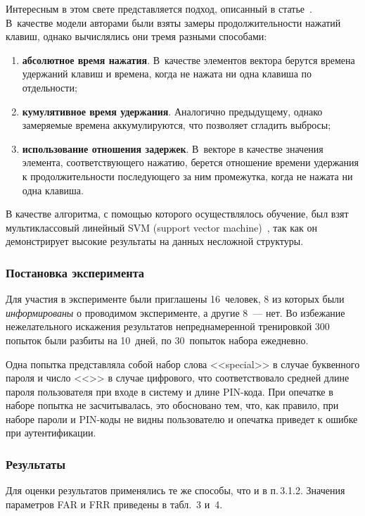\begin{multicols}{2}
Интересным в этом свете представляется подход, описанный в статье~\cite{saggio}. 
В~качестве модели авторами были взяты замеры
продолжительности нажатий клавиш, однако вычислялись они тремя
разными способами:
\begin{enumerate}[(1)]
    \item {\bf абсолютное время нажатия}. 
    В~качестве элементов вектора берутся времена удержаний клавиш и времена, 
    когда не нажата ни одна клавиша по отдельности;
    \item {\bf кумулятивное время удержания}. Аналогично предыдущему, однако 
    замеряемые времена аккумулируются, что позволяет сгладить вы\-бросы;
    \item {\bf использование отношения задержек}. В~векторе в качестве значения элемента, 
    соответствующего нажатию, берется отношение времени удержания к продолжительности 
    последующего за ним промежутка, когда не нажата ни одна клавиша.
\end{enumerate}
В качестве алгоритма, с помощью которого осуществлялось обучение,
был взят мультиклассовый линейный SVM (support vector machine)~\cite{svm}, так как он
демонстрирует высокие результаты на данных несложной структуры.

\subsubsection{Постановка эксперимента
}
Для участия в эксперименте были приглашены 16~человек, 8 из которых
были {\it информированы} о проводимом эксперименте, а другие 8~---
нет. Во избежание нежелательного искажения результатов
непреднамеренной тренировкой 300 попыток были разбиты на 10~дней, по
30~попыток набора ежед\-невно.

Одна попытка представляла собой набор слова <<{\sf special}>> в
случае буквенного пароля и число <<{}>> в случае
цифрового, что соответствовало средней длине пароля пользователя при
входе в систему и длине PIN-ко\-да. При опечатке в наборе попытка не
засчитывалась, это обосновано тем, что, как правило, при наборе
пароли и PIN-коды не видны пользователю и опечатка приведет к ошибке
при аутентификации.

\subsubsection{Результаты}

Для оценки результатов применялись те же способы, что и в
п.\,3.1.2. Значения параметров FAR и FRR приведены в табл.~3
и~4.



\end{multicols}
